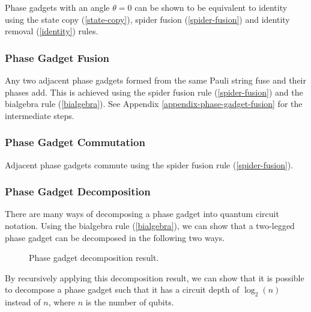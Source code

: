 Phase gadgets with an angle $\theta = 0$ can be shown to be equivalent to identity using the state copy (\ref{state-copy}), spider fusion (\ref{spider-fusion}) and identity removal (\ref{identity}) rules.



\subsubsection{Phase Gadget Fusion}%
\label{phase-gadget-fusion}

Any two adjacent phase gadgets formed from the same Pauli string fuse and their phases add. This is achieved using the spider fusion rule (\ref{spider-fusion}) and the bialgebra rule (\ref{bialgebra}). See Appendix  \ref{appendix-phase-gadget-fusion} for the intermediate steps.



\subsubsection{Phase Gadget Commutation}%
\label{phase-gadget-commutation}

Adjacent phase gadgets commute using the spider fusion rule (\ref{spider-fusion}).



\subsubsection{Phase Gadget Decomposition}%

There are many ways of decomposing a phase gadget into quantum circuit notation. Using the bialgebra rule (\ref{bialgebra}), we can show that a two-legged phase gadget can be decomposed in the following two ways.

\begin{figure}[H]
    \centering
    \caption{Phase gadget decomposition result.}
    \label{phase-gadget-decomposition}
\end{figure}

By recursively applying this decomposition result, we can show that it is possible to decompose a phase gadget such that it has a circuit depth of $\log_2(n)$ instead of $n$, where $n$ is the number of qubits.

